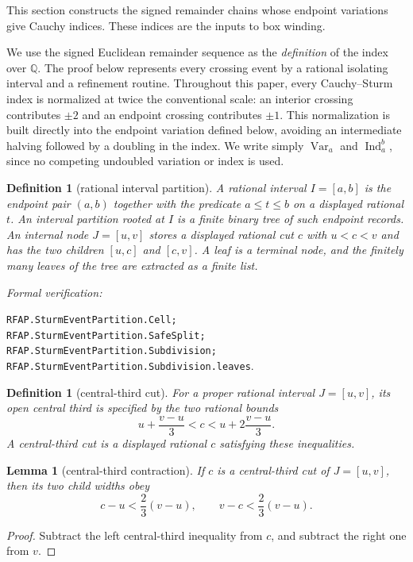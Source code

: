 \documentclass[11pt]{article}
\newtheorem{lemma}[theorem]{Lemma}
\newtheorem{definition}[theorem]{Definition}
\newcommand{\Q}{\mathbb{Q}}
\newcommand{\Ind}{\operatorname{Ind}}
\newcommand{\Var}{\operatorname{Var}}
\newcommand{\leanref}[1]{\par\smallskip\noindent
  \emph{Formal verification:}\par\nobreak
  {\raggedright\nolinkurl{#1}.\par}}
\begin{document}
This section constructs the signed remainder chains whose endpoint
variations give Cauchy indices.  These indices are the inputs to box winding.

We use the signed Euclidean remainder sequence as the \emph{definition} of
the index over $\Q$.  The proof below represents every crossing event by a
rational isolating interval and a refinement routine.  Throughout this paper,
every Cauchy--Sturm index is
normalized at twice the conventional scale: an interior crossing contributes
$\pm2$ and an endpoint crossing contributes $\pm1$.  This normalization is
built directly into the endpoint variation defined below, avoiding an
intermediate halving followed by a doubling in the index.  We write simply
$\Var_a$ and $\Ind_a^b$, since no competing undoubled variation or index is
used.

\begin{definition}[rational interval partition]
\label{def:rational-interval-partition}
A rational interval $I=[a,b]$ is the endpoint pair $(a,b)$ together with the
predicate $a\le t\le b$ on a displayed rational $t$.  An \emph{interval
partition} rooted at $I$ is a finite binary tree of such endpoint records.
An internal node $J=[u,v]$ stores a displayed rational cut $c$ with $u<c<v$
and has the two children $[u,c]$ and $[c,v]$.  A \emph{leaf} is a terminal
node, and the finitely many leaves of the tree are extracted as a finite
list.
\end{definition}

\leanref{RFAP.SturmEventPartition.Cell;
RFAP.SturmEventPartition.SafeSplit;
RFAP.SturmEventPartition.Subdivision;
RFAP.SturmEventPartition.Subdivision.leaves}

\begin{definition}[central-third cut]
\label{def:central-third-cut}
For a proper rational interval $J=[u,v]$, its \emph{open central third} is
specified by the two rational bounds
\[
 u+\frac{v-u}{3}<c< u+2\frac{v-u}{3}.
\]
A \emph{central-third cut} is a displayed rational $c$ satisfying these
inequalities.
\end{definition}

\begin{lemma}[central-third contraction]
\label{lem:central-third-contraction}
If $c$ is a central-third cut of $J=[u,v]$, then its two child widths obey
\[
 c-u<\frac23(v-u),\qquad v-c<\frac23(v-u).
\]
\end{lemma}

\begin{proof}
Subtract the left central-third inequality from $c$, and subtract the right
one from $v$.
\end{proof}
\end{document}
